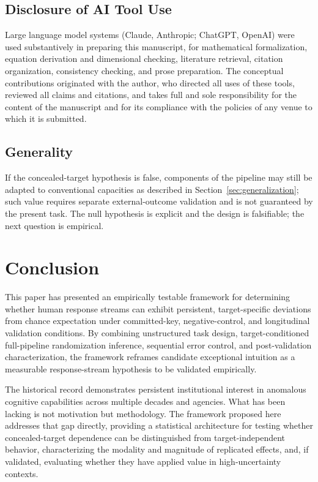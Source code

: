 \documentclass[11pt,letterpaper]{article}
\begin{document}
\subsection{Disclosure of AI Tool Use}

Large language model systems (Claude, Anthropic; ChatGPT, OpenAI) were used substantively in preparing this manuscript, for mathematical formalization, equation derivation and dimensional checking, literature retrieval, citation organization, consistency checking, and prose preparation. The conceptual contributions originated with the author, who directed all uses of these tools, reviewed all claims and citations, and takes full and sole responsibility for the content of the manuscript and for its compliance with the policies of any venue to which it is submitted.

\subsection{Generality}

If the concealed-target hypothesis is false, components of the pipeline may still be adapted to conventional capacities as described in Section~\ref{sec:generalization}; such value requires separate external-outcome validation and is not guaranteed by the present task. The null hypothesis is explicit and the design is falsifiable; the next question is empirical.

\section{Conclusion}

This paper has presented an empirically testable framework for determining whether human response streams can exhibit persistent, target-specific deviations from chance expectation under committed-key, negative-control, and longitudinal validation conditions. By combining unstructured task design, target-conditioned full-pipeline randomization inference, sequential error control, and post-validation characterization, the framework reframes candidate exceptional intuition as a measurable response-stream hypothesis to be validated empirically.

The historical record demonstrates persistent institutional interest in anomalous cognitive capabilities across multiple decades and agencies. What has been lacking is not motivation but methodology. The framework proposed here addresses that gap directly, providing a statistical architecture for testing whether concealed-target dependence can be distinguished from target-independent behavior, characterizing the modality and magnitude of replicated effects, and, if validated, evaluating whether they have applied value in high-uncertainty contexts.
\end{document}
